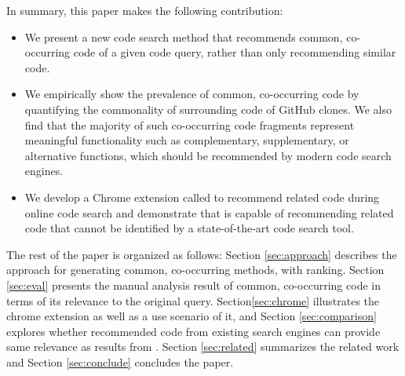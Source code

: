 In summary, this paper makes the following contribution:
\begin{itemize}
\item We present a new code search method that recommends common, co-occurring code of a given code query, rather than only recommending similar code.
\item We empirically show the prevalence of common, co-occurring code by quantifying the commonality of surrounding code of GitHub clones. We also find that the majority of such co-occurring code fragments represent meaningful functionality such as complementary, supplementary, or alternative functions, which should be recommended by modern code search engines.
\item We develop a Chrome extension called {\tool} to recommend related code during online code search and demonstrate that {\tool} is capable of recommending related code that cannot be identified by a state-of-the-art code search tool.
\end{itemize}

The rest of the paper is organized as follows: Section
\ref{sec:approach} describes the approach for generating
common, co-occurring methods, with ranking. Section \ref{sec:eval} presents the manual analysis result of common, co-occurring code in terms of its relevance to the original query. Section\ref{sec:chrome} illustrates the chrome extension {\tool} as well as a use scenario of it, and Section \ref{sec:comparison} explores whether recommended code from existing search engines can provide same relevance as results from {\tool}. Section \ref{sec:related} summarizes the related work and Section \ref{sec:conclude} concludes the paper.
